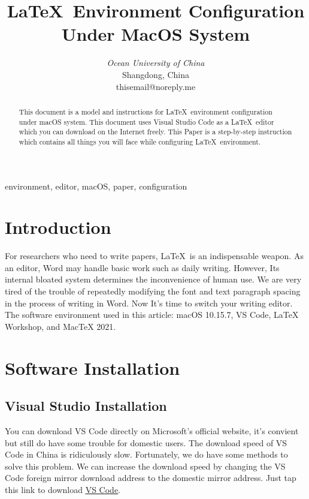 \documentclass[conference]{IEEEtran}
\begin{document}
\title{\LaTeX\ Environment Configuration Under MacOS System\\
}

\author{
\textit{Ocean University of China}\\
Shangdong, China \\
thisemail@noreply.me}

\maketitle

\begin{abstract}
This document is a model and instructions for \LaTeX\ environment configuration under macOS system.
This document uses Visual Studio Code as a \LaTeX\ editor which you can download on the Internet freely.
This Paper is a step-by-step instruction which contains all things you will face while configuring \LaTeX\ environment.
\end{abstract}

\begin{IEEEkeywords}
environment, editor, macOS, paper, configuration
\end{IEEEkeywords}

\section{Introduction}
For researchers who need to write papers, \LaTeX\ is an indispensable weapon. 
As an editor, Word may handle basic work such as daily writing. 
However, Its internal bloated system determines the inconvenience of human use. 
We are very tired of the trouble of repeatedly modifying the font and text paragraph spacing in the process of writing in Word. 
Now It's time to switch your writing editor.
The software environment used in this article: macOS 10.15.7, VS Code, LaTeX Workshop, and MacTeX 2021.

\section{Software Installation}

\subsection{Visual Studio Installation\cite{2019Introducing}}
You can download VS Code directly on Microsoft's official website, it's convient but still do have some trouble for domestic users.
The download speed of VS Code in China is ridiculously slow. Fortunately, we do have some methods to solve this problem.
We can increase the download speed by changing the VS Code foreign mirror download address to the domestic mirror address.
Just tap this link to download \href{https://vscode.cdn.azure.cn/stable/8490d3dde47c57ba65ec40dd192d014fd2113496/VSCode-darwin.zip}{\underline{VS Code}}.
\end{document}
